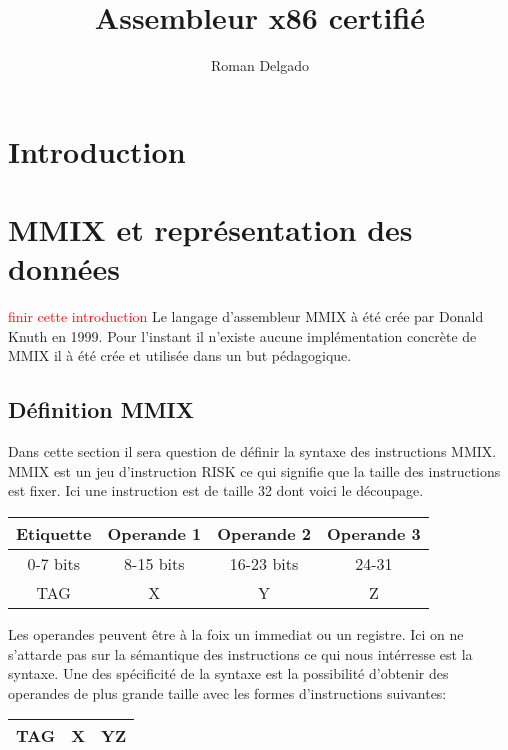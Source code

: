 \documentclass {article}
\title{Assembleur x86 certifié}
\author{Roman Delgado}
\date{}
\theoremstyle{definition}
\theoremstyle{remark}
\newcommand{\todo}[1]{\textcolor{red}{#1}}
\begin{document}
\maketitle



\vfill
\setcounter{tocdepth}{2}
\tableofcontents
\vfill


\section{Introduction}




\section{MMIX et représentation des données}
\label{partieMMIX}

\todo{finir cette introduction}
Le langage d'assembleur MMIX à été crée par Donald Knuth en 1999.
Pour l'instant il n'existe aucune implémentation concrète de MMIX il
à été crée et utilisée dans un but pédagogique.







\subsection{Définition MMIX}

Dans cette section il sera question de définir la syntaxe des instructions MMIX.
MMIX est un jeu d'instruction RISK ce qui signifie que la taille des instructions
est fixer. Ici une instruction est de taille 32 dont voici le découpage.

\begin{tabular}{|c|c|c|c|}
  \hline
  Etiquette & Operande 1 & Operande 2 & Operande 3\\
  \hline
  0-7 bits & 8-15 bits & 16-23 bits & 24-31  \\
  \hline
  TAG & X & Y & Z \\
  \hline
\end{tabular}
Les operandes peuvent être à la foix un immediat ou un registre.
Ici on ne s'attarde pas sur la sémantique des instructions ce qui nous intérresse
est la syntaxe. Une des spécificité de la syntaxe est la possibilité d'obtenir des operandes
de plus grande taille avec les formes d'instructions suivantes:\\
\begin{tabular}{|c|c|c|}
  \hline 
  TAG & X & YZ \\
  \hline
\end{tabular}
\end{document}
